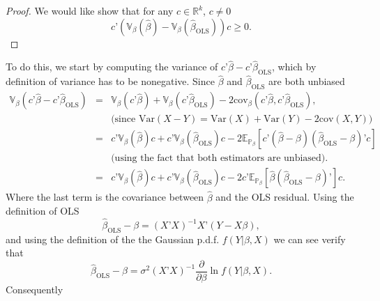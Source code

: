 \documentclass[11pt]{article} %
\begin{document}
\begin{proof}
We would like show  that for any $c \in \mathbb{R}^{k}$, $c \neq 0$
\[ c’ \left( \mathbb{V}_{\beta} ( \widehat{\beta} ) - \mathbb{V}_{\beta} (\widehat{\beta}_{\textrm{OLS}}) \right) c \geq 0. \]
\end{proof}
To do this, we start by computing the variance of $c’\widehat{\beta} - c’ \widehat{\beta}_{\textrm{OLS}}$, 
which by definition of variance has to be nonegative. Since $\widehat{\beta}$ and $\widehat{\beta}_{\textrm{OLS}}$ are both unbiased
\begin{eqnarray*}
\mathbb{V}_{\beta} \left( c’\widehat{\beta} - c’ \widehat{\beta}_{\textrm{OLS}} \right)&=&  \mathbb{V}_{\beta} (c’\widehat{\beta}) + \mathbb{V}_{\beta} (c’\widehat{\beta}_{\textrm{OLS}}) - 2 \textrm{cov}_{\beta} ( c’\widehat{\beta} , c’ \widehat{\beta}_{\textrm{OLS}}  ),  \\
&&  \textrm{(since $\textrm{Var}(X-Y) = \textrm{Var}(X) + \textrm{Var}(Y)- 2 \textrm{cov}(X,Y)$)}\\
&=& c’ \mathbb{V}_{\beta}(\widehat{\beta}) c + c’ \mathbb{V}_{\beta}(\widehat{\beta}_{\textrm{OLS}}) c - 2 \mathbb{E}_{\mathbb{P}_{\beta}} \left[  c’ (\widehat{\beta}-\beta) (\widehat{\beta}_{\textrm{OLS}}-\beta)’ c \right] \\
&& \textrm{(using the fact that both estimators are unbiased)}. \\
&=& c’ \mathbb{V}_{\beta}(\widehat{\beta}) c + c’ \mathbb{V}_{\beta}(\widehat{\beta}_{\textrm{OLS}}) c - 2 c’ \mathbb{E}_{\mathbb{P}_{\beta}} \left[  \widehat{\beta} (\widehat{\beta}_{\textrm{OLS}}-\beta)’  \right] c. 
\end{eqnarray*}
Where the last term is the covariance between $\widehat{\beta}$ and the OLS residual. Using the definition of OLS
\[ \widehat{\beta}_{\textrm{OLS}}- \beta = (X’X)^{-1} X’(Y-X\beta),  \]
and using the definition of the the Gaussian p.d.f. $f(Y | \beta,X)$ we can see verify that
\[\widehat{\beta}_{\textrm{OLS}}- \beta =  \sigma^2  (X’X)^{-1} \frac{\partial}{\partial \beta} \ln f(Y | \beta, X ).  \]
Consequently 
\end{document}
